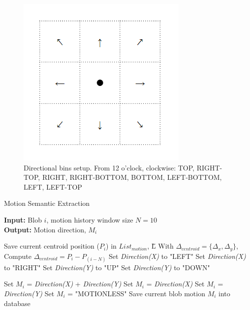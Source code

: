 \begin{figure}[!tb]\centering
\includegraphics[width=.3\textwidth]{image/new/motion.PNG}
\caption{Directional bins setup. From 12 o'clock, clockwise: TOP, RIGHT-TOP, RIGHT, RIGHT-BOTTOM, BOTTOM, LEFT-BOTTOM, LEFT, LEFT-TOP}
\label{fig:cardinalbins}
\end{figure}

 \begin{algorithm}[!t]
    \caption{Motion Semantic Extraction}
    \label{algo:motion}
    \hspace*{\algorithmicindent} \textbf{Input:} Blob $i$, motion history window size $N=10$\\
    \hspace*{\algorithmicindent} \textbf{Output:} Motion direction, $M_i$
    \begin{algorithmic}[1]
        \STATE Save current centroid position ($P_i$) in $List_{motion}$, \H{L}
        \STATE With $\Delta_{centroid} = \{\Delta_x, \Delta_y\}$, Compute $\Delta_{centroid} = P_i -P_{(i-N)}$
        \STATE Set \textit{Direction(X)} to "LEFT"
        \ELSE
        \STATE Set \textit{Direction(X)} to "RIGHT"
        \ENDIF
        \ENDIF
        \STATE Set \textit{Direction(Y)} to "UP"
        \ELSE
        \STATE Set \textit{Direction(Y)} to "DOWN"
        \ENDIF
        \ENDIF

        \STATE Set $M_i$ = \textit{Direction(X)} + \textit{Direction(Y)}
        \ELSE
        \STATE Set $M_i$ = \textit{Direction(X) }
        \STATE Set $M_i$ = \textit{Direction(Y)}
        \ELSE
        \STATE Set $M_i$ = "MOTIONLESS"
        \ENDIF
        \ENDIF
        \ENDIF
        \STATE Save current blob motion $M_i$ into database
        \ENDFOR
    \end{algorithmic}
\end{algorithm}



